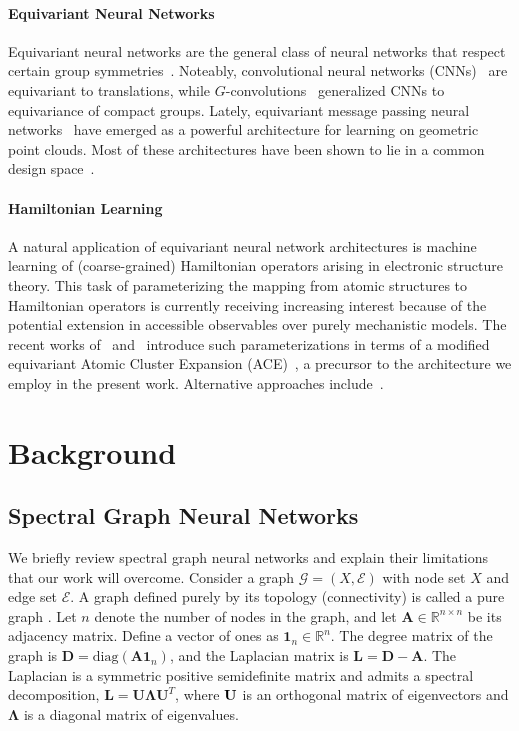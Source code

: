 \documentclass{article} \usepackage{iclr2024_conference,times}
\newcommand{\R}{\mathbb{R}}
\def\R{\mathbb{R}}
\begin{document}
\paragraph{Equivariant Neural Networks} Equivariant neural networks are the general class of neural networks that respect certain group symmetries~\citep{Bronstein:2021mdi}. Noteably, convolutional neural networks (CNNs)~\citep{CNNlecun} are equivariant to translations, while $G$-convolutions~\citep{CohenSteerable2016, s.2018spherical, pmlr-v80-kondor18a} generalized CNNs to equivariance of compact groups. Lately, equivariant message passing neural networks~\citep{Anderson2019CormorantCM, Welling2021EGNN, brandstetter2022geometric, nequip, Batatia2022mace, Batatia2022de} have emerged as a powerful architecture for learning on geometric point clouds. Most of these architectures have been shown to lie in a common design space~\cite{Batatia2022de, batatia2023general}.

\paragraph{Hamiltonian Learning} A natural application of equivariant neural network architectures is machine learning of (coarse-grained) Hamiltonian operators arising in electronic structure theory. This task of parameterizing the mapping from atomic structures to Hamiltonian operators is currently receiving increasing interest because of the potential extension in accessible observables over purely mechanistic models. The recent works of~\cite{Nigam2022-hamiltonians} and~\cite{2021-acetb1} introduce such parameterizations in terms of a modified equivariant Atomic Cluster Expansion (ACE)~\citep{Drautz2020-tensors}, a precursor to the architecture we employ in the present work. Alternative approaches include~\citep{Hegde2017-ay, Schutt2019-um, Unke-sg-2021, Gu2023-om}.



\section{Background}

\subsection{Spectral Graph Neural Networks}

We briefly review spectral graph neural networks and explain their limitations that our work will overcome.
Consider a graph $\mathcal{G} = (X, \mathcal{E})$ with node set $X$ and edge set $\mathcal{E}$. A graph defined purely by its topology (connectivity) is called a pure graph {\bf}.
Let $n$ denote the number of nodes in the graph, and let $\mathbf{A} \in \R^{n \times n}$ be its adjacency matrix. Define a vector of ones as $\mathbf{1}_{n} \in \R^{n}$. The degree matrix of the graph is $\mathbf{D} = \text{diag}(\mathbf{A} \mathbf{1}_{n})$, and the Laplacian matrix is $\mathbf{L} = \mathbf{D} - \mathbf{A}$.
The Laplacian is a symmetric positive semidefinite matrix and admits a spectral decomposition, $\mathbf{L}  = \mathbf{U} \mathbf{\Lambda} \mathbf{U}^{T}$, where ${\bf U}$ is an orthogonal matrix of eigenvectors and $\mathbf{\Lambda}$ is a diagonal matrix of eigenvalues.
\end{document}
